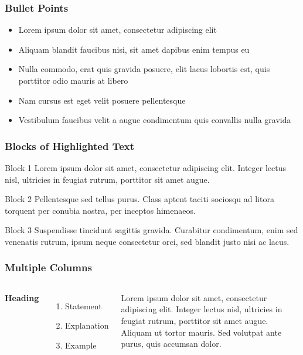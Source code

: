\documentclass[compress]{beamer}
\numberwithin{figure}{section}
\numberwithin{table}{section}
\numberwithin{equation}{section}
\numberwithin{thm}{section}
\numberwithin{defn}{section}
\numberwithin{lmm}{section}
\theoremstyle{example}
\numberwithin{figure}{section}
\numberwithin{table}{section}
\numberwithin{equation}{section}
\begin{document}

\begin{frame}
\frametitle{Bullet Points}
\begin{itemize}[<+-| alert@+>]
\item Lorem ipsum dolor sit amet, consectetur adipiscing elit
\item Aliquam blandit faucibus nisi, sit amet dapibus enim tempus eu
\item Nulla commodo, erat quis gravida posuere, elit lacus lobortis est, quis porttitor odio mauris at libero
\item Nam cursus est eget velit posuere pellentesque
\item Vestibulum faucibus velit a augue condimentum quis convallis nulla gravida
\end{itemize}
\end{frame}


\begin{frame}
\frametitle{Blocks of Highlighted Text}
\begin{block}{Block 1}
Lorem ipsum dolor sit amet, consectetur adipiscing elit. Integer lectus nisl, ultricies in feugiat rutrum, porttitor sit amet augue.
\end{block}

\begin{exampleblock}{Block 2}
Pellentesque sed tellus purus. Class aptent taciti sociosqu ad litora torquent per conubia nostra, per inceptos himenaeos.
\end{exampleblock}

\begin{alertblock}{Block 3}
Suspendisse tincidunt sagittis gravida. Curabitur condimentum, enim sed venenatis rutrum, ipsum neque consectetur orci, sed blandit justo nisi ac lacus.
\end{alertblock}
\end{frame}


\begin{frame}
\frametitle{Multiple Columns}
\begin{columns}[c] %

\textbf{Heading}
\begin{enumerate}
\item Statement
\item Explanation
\item Example
\end{enumerate}

Lorem ipsum dolor sit amet, consectetur adipiscing elit. Integer lectus nisl, ultricies in feugiat rutrum, porttitor sit amet augue. Aliquam ut tortor mauris. Sed volutpat ante purus, quis accumsan dolor.

\end{columns}
\end{frame}
\end{document}
